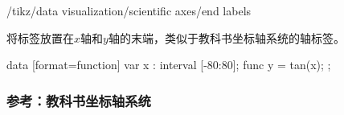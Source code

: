 \begin{key}{/tikz/data visualization/scientific axes/end labels}

    将标签放置在$x$轴和$y$轴的末端，类似于教科书坐标轴系统的轴标签。
\begin{codeexample}[
    width=8cm,
    preamble={\usetikzlibrary{datavisualization.formats.functions}},
]
\tikz \datavisualization [
  scientific axes={clean, end labels},
  visualize as smooth line,
  x axis={label=degree $d$,
    ticks={tick unit={}^\circ}},
  y axis={label=$\tan d$}]
data [format=function] {
  var x : interval [-80:80];
  func y = tan(\value x);
};
\end{codeexample}
\end{key}


\subsubsection{参考：教科书坐标轴系统}

